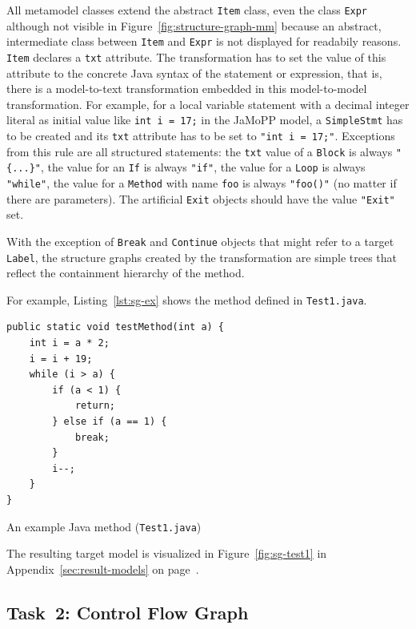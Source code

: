 \documentclass[11pt]{article}
\begin{document}
All metamodel classes extend the abstract \verb|Item| class, even the class
\verb|Expr| although not visible in Figure~\ref{fig:structure-graph-mm} because
an abstract, intermediate class between \verb|Item| and \verb|Expr| is not
displayed for readabily reasons.  \verb|Item| declares a \verb|txt| attribute.
The transformation has to set the value of this attribute to the concrete Java
syntax of the statement or expression, that is, there is a model-to-text
transformation embedded in this model-to-model transformation.  For example,
for a local variable statement with a decimal integer literal as initial value
like \verb|int i = 17;| in the JaMoPP model, a \verb|SimpleStmt| has to be
created and its \verb|txt| attribute has to be set to \verb|"int i = 17;"|.
Exceptions from this rule are all structured statements: the \verb|txt| value
of a \verb|Block| is always \verb|"{...}"|, the value for an \verb|If| is
always \verb|"if"|, the value for a \verb|Loop| is always \verb|"while"|, the
value for a \verb|Method| with name \verb|foo| is always \verb|"foo()"| (no
matter if there are parameters).  The artificial \verb|Exit| objects should
have the value \verb|"Exit"| set.

With the exception of \verb|Break| and \verb|Continue| objects that might refer
to a target \verb|Label|, the structure graphs created by the transformation
are simple trees that reflect the containment hierarchy of the method.

For example, Listing~\ref{lst:sg-ex} shows the method defined in
\verb|Test1.java|.

\begin{listing}
  \begin{verbatim}
public static void testMethod(int a) {
    int i = a * 2;
    i = i + 19;
    while (i > a) {
        if (a < 1) {
            return;
        } else if (a == 1) {
            break;
        }
        i--;
    }
}
  \end{verbatim}
  \caption{An example Java method (\texttt{Test1.java})}
  \label{lst:sg-ex}
\end{listing}

The resulting target model is visualized in Figure~\ref{fig:sg-test1} in
Appendix~\ref{sec:result-models} on page~\pageref{fig:sg-test1}.


\subsection{Task~2: Control Flow Graph}
\label{sec:task2-cf-graph}
\end{document}

